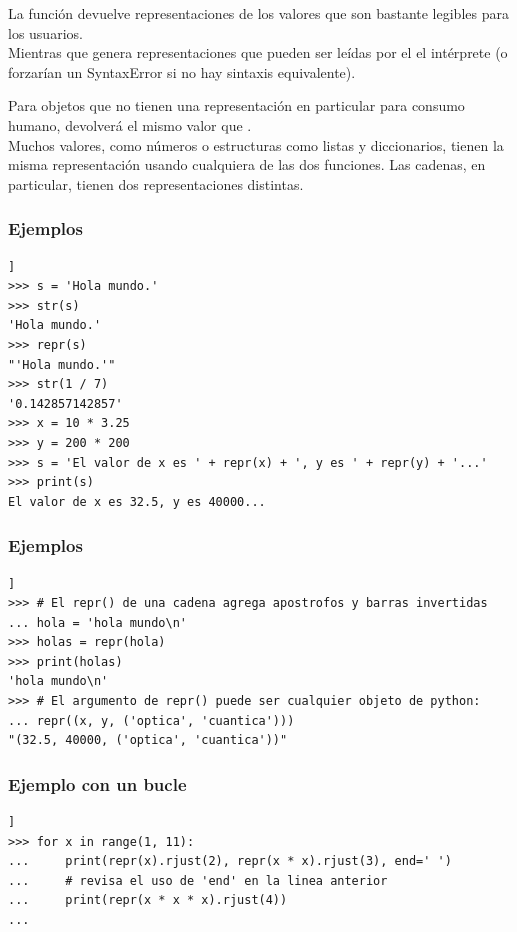 \begin{frame}
La función  devuelve representaciones de los valores que son bastante legibles para los usuarios.
\\
\bigskip
Mientras que  genera representaciones que pueden ser leídas por el el intérprete (o forzarían un SyntaxError si no hay sintaxis equivalente).
\end{frame}
\begin{frame}
Para objetos que no tienen una representación en particular para consumo humano,  devolverá el mismo valor que .
\\
\bigskip
Muchos valores, como números o estructuras como listas y diccionarios, tienen la misma representación usando cualquiera de las dos funciones. Las cadenas, en particular, tienen dos representaciones distintas.
\end{frame}
\begin{frame}
\frametitle{Ejemplos}
\begin{lstlisting}[numbers=none, basicstyle=\linespread{1.2}\ttfamily\small, columns=fullflexible]]
>>> s = 'Hola mundo.'
>>> str(s)
'Hola mundo.'
>>> repr(s)
"'Hola mundo.'"
>>> str(1 / 7)
'0.142857142857'
>>> x = 10 * 3.25
>>> y = 200 * 200
>>> s = 'El valor de x es ' + repr(x) + ', y es ' + repr(y) + '...'
>>> print(s)
El valor de x es 32.5, y es 40000...
\end{lstlisting}
\end{frame}
\begin{frame}[fragile]
\frametitle{Ejemplos}
\fontsize{12}{12}\selectfont
\begin{lstlisting}[numbers=none, basicstyle=\linespread{1.2}\ttfamily\small, columns=fullflexible]]
>>> # El repr() de una cadena agrega apostrofos y barras invertidas
... hola = 'hola mundo\n'
>>> holas = repr(hola)
>>> print(holas)
'hola mundo\n'
>>> # El argumento de repr() puede ser cualquier objeto de python:
... repr((x, y, ('optica', 'cuantica')))
"(32.5, 40000, ('optica', 'cuantica'))"
\end{lstlisting}
\end{frame}
\begin{frame}[fragile]
\frametitle{Ejemplo con un bucle}
\begin{lstlisting}[numbers=none, basicstyle=\linespread{1.2}\ttfamily\small, columns=fullflexible]]
>>> for x in range(1, 11):
...     print(repr(x).rjust(2), repr(x * x).rjust(3), end=' ')
...     # revisa el uso de 'end' en la linea anterior
...     print(repr(x * x * x).rjust(4))
...
\end{lstlisting}
\end{frame}
